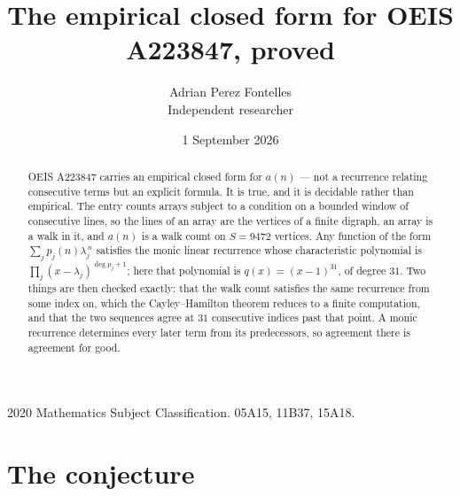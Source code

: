 \documentclass[11pt,a4paper]{article}
\title{The empirical closed form for OEIS A223847, proved}
\author{Adrian Perez Fontelles\\ \small Independent researcher}
\date{1 September 2026}
\theoremstyle{plain}
\theoremstyle{definition}
\begin{document}
\maketitle

\begin{abstract}
OEIS A223847 carries an empirical closed form for $a(n)$ --- not a recurrence relating
consecutive terms but an explicit formula. It is true, and it is decidable rather than
empirical. The entry counts arrays subject to a condition on a bounded window of consecutive lines, so the lines of an array are the
vertices of a finite digraph, an array is a walk in it, and $a(n)$ is a walk count on
$S=9472$ vertices. Any function of the form $\sum_j p_j(n)\lambda_j^{\,n}$ satisfies the
monic linear recurrence whose characteristic polynomial is
$\prod_j(x-\lambda_j)^{\deg p_j+1}$; here that polynomial is $q(x)=(x-1)^{31}$, of degree
$31$. Two things are then checked exactly: that the walk count satisfies the same
recurrence from some index on, which the Cayley--Hamilton theorem reduces to a finite
computation, and that the two sequences agree at $31$ consecutive indices past that
point. A monic recurrence determines every later term from its predecessors, so agreement
there is agreement for good.
\end{abstract}

\noindent\small 2020 Mathematics Subject Classification. 05A15, 11B37, 15A18.\normalsize

\section{The conjecture}
\end{document}
